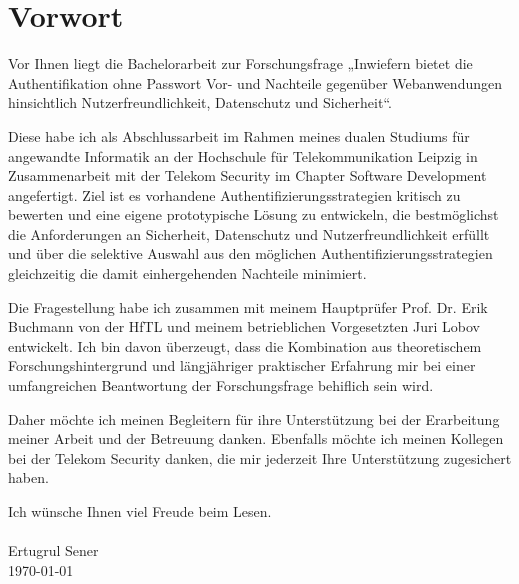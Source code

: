 \chapter{Vorwort}
Vor Ihnen liegt die Bachelorarbeit zur Forschungsfrage „Inwiefern bietet die Authentifikation ohne Passwort Vor- und Nachteile gegenüber Webanwendungen hinsichtlich Nutzerfreundlichkeit, Datenschutz und Sicherheit“.

Diese habe ich als Abschlussarbeit im Rahmen meines dualen Studiums für angewandte Informatik an der Hochschule für Telekommunikation Leipzig in Zusammenarbeit mit der Telekom Security im Chapter Software Development angefertigt. Ziel ist es vorhandene Authentifizierungsstrategien kritisch zu bewerten und eine eigene prototypische Lösung zu entwickeln, die bestmöglichst die Anforderungen an Sicherheit, Datenschutz und Nutzerfreundlichkeit erfüllt und über die selektive Auswahl aus den möglichen Authentifizierungsstrategien gleichzeitig die damit einhergehenden Nachteile minimiert.

Die Fragestellung habe ich zusammen mit meinem Hauptprüfer Prof. Dr. Erik Buchmann von der HfTL und meinem betrieblichen Vorgesetzten Juri Lobov entwickelt. Ich bin davon überzeugt, dass die Kombination aus theoretischem Forschungshintergrund und längjähriger praktischer Erfahrung mir bei einer umfangreichen Beantwortung der Forschungsfrage behiflich sein wird.

Daher möchte ich meinen Begleitern für ihre Unterstützung bei der Erarbeitung meiner Arbeit und der Betreuung danken.
Ebenfalls möchte ich meinen Kollegen bei der Telekom Security danken, die mir jederzeit Ihre Unterstützung zugesichert haben.

Ich wünsche Ihnen viel Freude beim Lesen.\\
\\
Ertugrul Sener\\
\today
